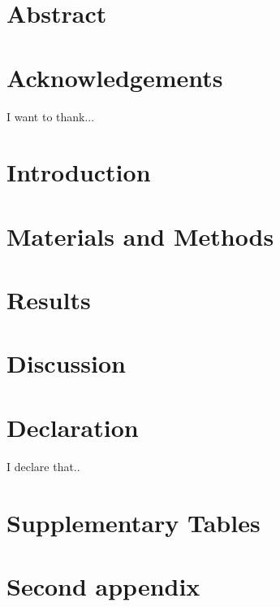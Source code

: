 \documentclass[12pt, twoside]{report}
\begin{document}


\chapter*{Abstract}


\chapter*{Acknowledgements}
I want to thank...

\tableofcontents
\listoffigures
\listoftables
\chapter{Introduction}
\label{chapter01}


\chapter{Materials and Methods}
\label{chapter02}


\chapter{Results}
\label{chapter03}


\chapter{Discussion}
\label{discussion}


\chapter*{Declaration}
I declare that..

\appendix
\chapter{Supplementary Tables}

\chapter{Second appendix}

\printbibliography
\end{document}
